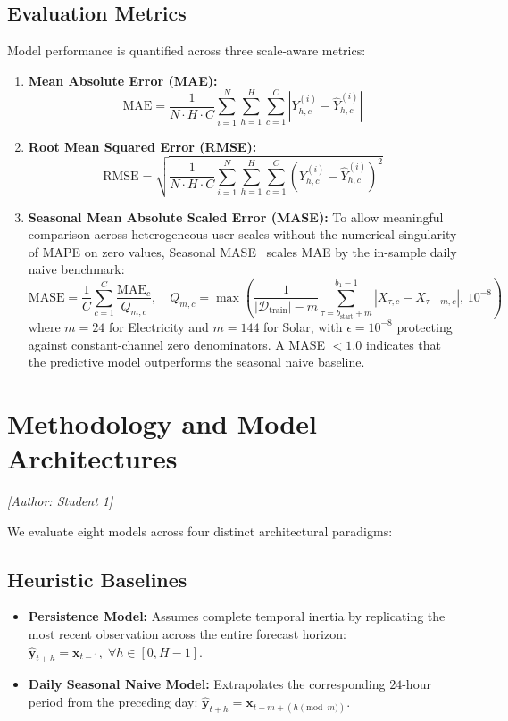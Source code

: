 \documentclass[11pt,a4paper]{article}
\begin{document}
\subsection{Evaluation Metrics}
Model performance is quantified across three scale-aware metrics:
\begin{enumerate}
    \item \textbf{Mean Absolute Error (MAE):}
    \begin{equation}
        \text{MAE} = \frac{1}{N \cdot H \cdot C} \sum_{i=1}^N \sum_{h=1}^H \sum_{c=1}^C \left| Y^{(i)}_{h, c} - \hat{Y}^{(i)}_{h, c} \right|
    \end{equation}
    \item \textbf{Root Mean Squared Error (RMSE):}
    \begin{equation}
        \text{RMSE} = \sqrt{\frac{1}{N \cdot H \cdot C} \sum_{i=1}^N \sum_{h=1}^H \sum_{c=1}^C \left( Y^{(i)}_{h, c} - \hat{Y}^{(i)}_{h, c} \right)^2 }
    \end{equation}
    \item \textbf{Seasonal Mean Absolute Scaled Error (MASE):}
    To allow meaningful comparison across heterogeneous user scales without the numerical singularity of MAPE on zero values, Seasonal MASE~\cite{hyndman2006another} scales MAE by the in-sample daily naive benchmark:
    \begin{equation}
        \text{MASE} = \frac{1}{C} \sum_{c=1}^C \frac{\text{MAE}_c}{Q_{m, c}}, \quad Q_{m, c} = \max\left( \frac{1}{|\mathcal{D}_{\text{train}}| - m} \sum_{\tau=b_{\text{start}}+m}^{b_1-1} \left| X_{\tau, c} - X_{\tau-m, c} \right|, \, 10^{-8} \right)
    \end{equation}
    where $m=24$ for Electricity and $m=144$ for Solar, with $\epsilon = 10^{-8}$ protecting against constant-channel zero denominators. A MASE $< 1.0$ indicates that the predictive model outperforms the seasonal naive baseline.
\end{enumerate}

\section{Methodology and Model Architectures}
\label{sec:methodology}
\noindent\textit{[Author: Student 1]}

We evaluate eight models across four distinct architectural paradigms:

\subsection{Heuristic Baselines}
\begin{itemize}
    \item \textbf{Persistence Model:} Assumes complete temporal inertia by replicating the most recent observation across the entire forecast horizon: $\hat{\mathbf{y}}_{t+h} = \mathbf{x}_{t-1}, \; \forall h \in [0, H-1]$.
    \item \textbf{Daily Seasonal Naive Model:} Extrapolates the corresponding $24$-hour period from the preceding day: $\hat{\mathbf{y}}_{t+h} = \mathbf{x}_{t - m + (h \pmod m)}$.
\end{itemize}
\end{document}
